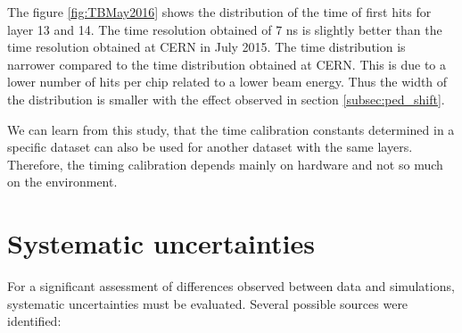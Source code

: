The figure \ref{fig:TBMay2016} shows the distribution of the time of first hits for layer 13 and 14. The time resolution obtained of 7 ns is slightly better than the time resolution obtained at CERN in July 2015. The time distribution is narrower compared to the time distribution obtained at CERN. This is due to a lower number of hits per chip related to a lower beam energy. Thus the width of the distribution is smaller with the effect observed in section \ref{subsec:ped_shift}.

We can learn from this study, that the time calibration constants determined in a specific dataset can also be used for another dataset with the same layers. Therefore, the timing calibration depends mainly on hardware and not so much on the environment.

\section{Systematic uncertainties}

For a significant assessment of differences observed between data and simulations, systematic uncertainties must be evaluated. Several possible sources were identified:

